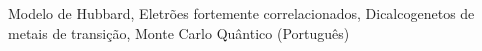 \begin{palavraschave}
Modelo de Hubbard, Eletrões fortemente correlacionados, Dicalcogenetos de metais de transição, Monte Carlo Quântico (Português)
\end{palavraschave}
\clearpage
\thispagestyle{empty}
\cleardoublepage